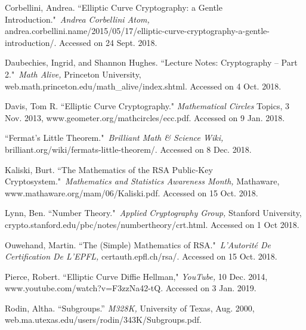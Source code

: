 \documentclass[a4paper,12pt]{article}
\theoremstyle{definition}
\begin{document}
\begin{flushleft}
Corbellini, Andrea. ``Elliptic Curve Cryptography: a Gentle Introduction." \textit{Andrea Corbellini Atom,} andrea.corbellini.name/2015/05/17/elliptic-curve-cryptography-a-gentle-introduction/. Accessed on 24 Sept. 2018.

Daubechies, Ingrid, and Shannon Hughes. ``Lecture Notes: Cryptography – Part 2." \textit{Math Alive,} Princeton University, web.math.princeton.edu/math\_alive/index.shtml. Accessed on 4 Oct. 2018.

Davis, Tom R. ``Elliptic Curve Cryptography." \textit{Mathematical Circles} Topics, 3 Nov. 2013, www.geometer.org/mathcircles/ecc.pdf. Accessed on 9 Jan. 2018.

``Fermat's Little Theorem." \textit{Brilliant Math \& Science Wiki,} brilliant.org/wiki/fermats-little-theorem/. Accessed on 8 Dec. 2018.

Kaliski, Burt. ``The Mathematics of the RSA Public-Key Cryptosystem." \textit{Mathematics and Statistics Awareness Month,} Mathaware, www.mathaware.org/mam/06/Kaliski.pdf. Accessed on 15 Oct. 2018.

Lynn, Ben. ``Number Theory." \textit{Applied Cryptography Group,} Stanford University, crypto.stanford.edu/pbc/notes/numbertheory/crt.html. Accessed on 1 Oct 2018.

\newpage

Ouwehand, Martin. ``The (Simple) Mathematics of RSA." \textit{L'Autorité De Certification De L'EPFL,} certauth.epfl.ch/rsa/. Accessed on 15 Oct. 2018.

Pierce, Robert. ``Elliptic Curve Diffie Hellman," \textit{YouTube,} 10 Dec. 2014, www.youtube.com/watch?v=F3zzNa42-tQ. Accessed on 3 Jan. 2019.

Rodin, Altha. “Subgroups.” \textit{M328K,} University of Texas, Aug. 2000, web.ma.utexas.edu/users/rodin/343K/Subgroups.pdf.


\end{flushleft}



	
\end{document}
